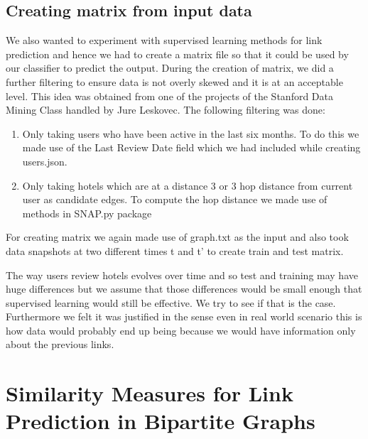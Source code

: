 \documentclass[letterpaper,twocolumn,11pt]{article}
\begin{document}
\subsection{Creating matrix from input data}

We also wanted to experiment with supervised learning methods for link prediction and hence we had to create a matrix file so that it could be used by our classifier to predict the output. During the creation of matrix, we did a further filtering to ensure data is not overly skewed and it is at an acceptable level. This idea was obtained from one of the projects of the Stanford Data Mining Class handled by Jure Leskovec. The following filtering was done:

\begin{enumerate}
\item Only taking users who have been active in the last six months. To do this we made use of the Last Review Date field which we had included while creating users.json.

\item Only taking hotels which are at a distance 3 or 3 hop distance from current user as candidate edges. To compute the hop distance we made use of methods in SNAP.py package
\end{enumerate}

For creating matrix we again made use of graph.txt as the input and also took data snapshots at two different times t and t' to create train and test matrix.

The way users review hotels evolves over time and so test and training may have huge differences but we assume that those differences would be small enough that supervised learning would still be effective. We try to see if that is the case. Furthermore we felt it was justified in the sense even in real world scenario this is how data would probably end up being because we would have information only about the previous links.


\section{Similarity Measures for Link Prediction in Bipartite Graphs}
\end{document}
